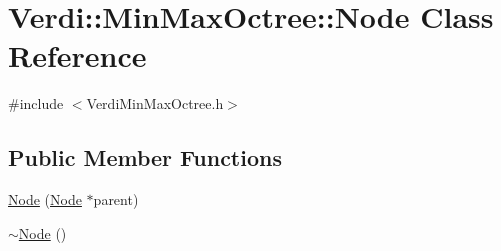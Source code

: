 \hypertarget{class_verdi_1_1_min_max_octree_1_1_node}{\section{\-Verdi\-:\-:\-Min\-Max\-Octree\-:\-:\-Node \-Class \-Reference}
\label{class_verdi_1_1_min_max_octree_1_1_node}
}


{\ttfamily \#include $<$\-Verdi\-Min\-Max\-Octree.\-h$>$}

\subsection*{\-Public \-Member \-Functions}
\begin{DoxyCompactItemize}
\item 
\hyperlink{class_verdi_1_1_min_max_octree_1_1_node_a58bb78bbee2acb1dbb28256e74ccecda}{\-Node} (\hyperlink{class_verdi_1_1_min_max_octree_1_1_node}{\-Node} $\ast$parent)
\item 
\hyperlink{class_verdi_1_1_min_max_octree_1_1_node_a5aa37502e11248f756c5dd5295097e99}{$\sim$\-Node} ()
\end{DoxyCompactItemize}
